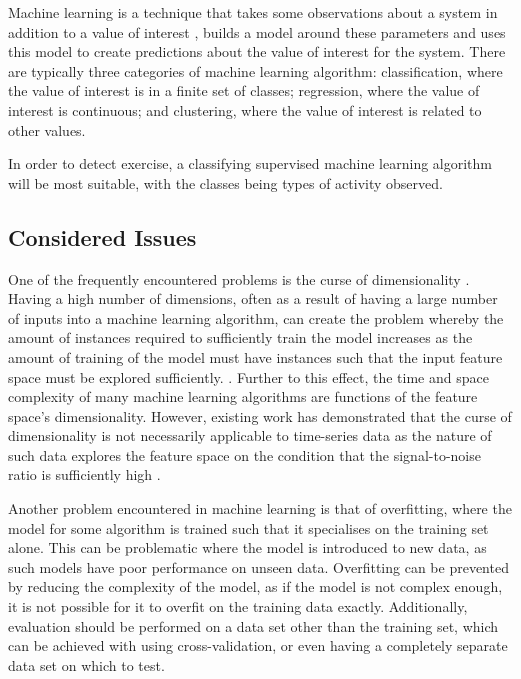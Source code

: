 \label{ml}

Machine learning is a technique that takes some observations about a system in addition to a value of interest , builds a model around these parameters and uses this model to create predictions about the value of interest for the system. There are typically three categories of machine learning algorithm: classification, where the value of interest is in a finite set of classes; regression, where the value of interest is continuous; and clustering, where the value of interest is related to other values.

In order to detect exercise, a classifying supervised machine learning algorithm will be most suitable, with the classes being types of activity observed.

\subsection{Considered Issues}

One of the frequently encountered problems is the curse of dimensionality \cite{bellman1957dynamic}. Having a high number of dimensions, often as a result of having a large number of inputs into a machine learning algorithm, can create the problem whereby the amount of instances required to sufficiently train the model increases as the amount of training of the model must have instances such that the input feature space must be explored sufficiently. \cite{oommen2008objective}. Further to this effect, the time and space complexity of many machine learning algorithms are functions of the feature space's dimensionality. However, existing work has demonstrated that the curse of dimensionality is not necessarily applicable to time-series data as the nature of such data explores the feature space on the condition that the signal-to-noise ratio is sufficiently high \cite{bernecker2011quality}.

Another problem encountered in machine learning is that of overfitting, where the model for some algorithm is trained such that it specialises on the training set alone. This can be problematic where the model is introduced to new data, as such models have poor performance on unseen data. Overfitting can be prevented by reducing the complexity of the model, as if the model is not complex enough, it is not possible for it to overfit on the training data exactly. Additionally, evaluation should be performed on a data set other than the training set, which can be achieved with using cross-validation, or even having a completely separate data set on which to test.

